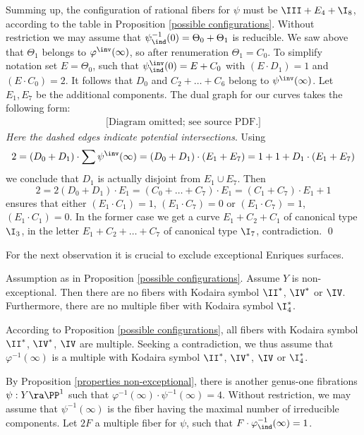 Summing up, the configuration of rational fibers for $\psi$
must be $\III+E_4+\I_8$, according to the   table in Proposition \ref{possible configurations}.
Without restriction we may assume that $\psi^{-1}_\ind(0)=\Theta_0+\Theta_1$ is reducible.
We saw above that $\Theta_1$ belongs to $\varphi^\inv(\infty)$, so after renumeration $\Theta_1=C_0$.
To simplify notation set $E=\Theta_0$, such that
$\psi^\inv_\ind(0)=E+C_0$   with $(E\cdot D_1)=1$ and $(E\cdot C_0)=2$.
It follows that  $D_0$ and $C_2+\ldots+C_6$ belong  to $\psi^\inv(\infty)$. Let $E_1,E_7$ be the additional components.
The dual graph for our curves takes the following form:
\begin{equation*}
\begin{gathered}
\text{[Diagram omitted; see source PDF.]}
\end{gathered}
\end{equation*}
\emph{Here the dashed edges indicate potential intersections}.
Using
$$
2=(D_0+D_1) \cdot\sum \psi^\inv(\infty) = (D_0+D_1)\cdot(E_1+E_7) = 1+1 + D_1\cdot(E_1+E_7)
$$
we conclude that $D_1$ is actually disjoint from $E_1\cup E_7$. Then
$$
2=2(D_0+D_1)\cdot E_1 = (C_0+\ldots+C_7)\cdot E_1 = (C_1+C_7)\cdot E_1 +1
$$
ensures that either $(E_1\cdot C_1)=1$, $(E_1\cdot C_7)=0$ or $(E_1\cdot C_7)=1$, $(E_1\cdot C_1)=0$.
In the former case we get a curve    $E_1+C_2+C_1$ of canonical type $\I_3$, in the letter
$E_1+C_2+\ldots+C_7$ of canonical type $\I_7$, contradiction.
\qed


For the next observation it is crucial to  exclude exceptional Enriques surfaces.

\begin{proposition}
\notready
\label{no II*, IV*, IV}
Assumption as in Proposition \ref{possible configurations}. Assume  $Y$ is non-exceptional.
Then there are no fibers with Kodaira symbol $\II^*$, $\IV^*$ or  $\IV$. Furthermore, there are no multiple fiber
with Kodaira symbol $\I_4^*$.
\end{proposition}

\proof
According to Proposition \ref{possible configurations}, all fibers with Kodaira symbol $\II^*$, $\IV^*$, $\IV$ are multiple.
Seeking a contradiction, we thus assume that $\varphi^{-1}(\infty)$ is a multiple with  Kodaira symbol $\II^*$, $\IV^*$, $\IV$
or  $\I_4^*$.

By  Proposition \ref{properties non-exceptional}, there is another genus-one fibrations $\psi:Y\ra\PP^1$
such that  $\varphi^{-1}(\infty)\cdot \psi^{-1}(\infty)=4$.
Without restriction, we may assume that $\psi^{-1}(\infty)$ is the   fiber  having
the maximal number of irreducible components.
Let  $2F$  a  multiple fiber  for $\psi$, such that  $F\cdot \varphi_\ind^{-1}(\infty)=1$.

